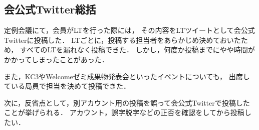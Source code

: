 \subsection*{会公式Twitter総括}



定例会議にて，会員がLTを行った際には，
その内容をLTツイートとして会公式Twitterに投稿した．
LTごとに，投稿する担当者をあらかじめ決めておいたため，
すべてのLTを漏れなく投稿できた．
しかし，何度か投稿までにやや時間がかかってしまったことがあった．

また，KC3やWelcomeゼミ成果物発表会といったイベントについても，
出席している局員で担当を決めて投稿できた．

次に，反省点として，別アカウント用の投稿を誤って会公式Twitterで投稿したことが挙げられる．
アカウント，誤字脱字などの正否を確認をしてから投稿したい．

